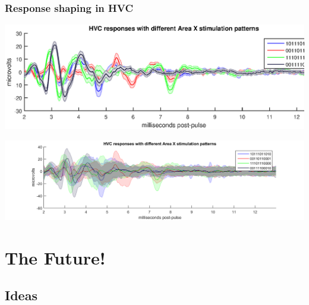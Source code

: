 \documentclass{beamer}
\begin{document}
\begin{frame}
  \frametitle{Response shaping in HVC}
  \includegraphics[width=\textwidth]{current_steering_hvc_responses}
  
  \includegraphics[width=\textwidth]{current_steering_hvc_responses_std}
\end{frame}





\section{The Future!}
\subsection{Ideas}
\end{document}
